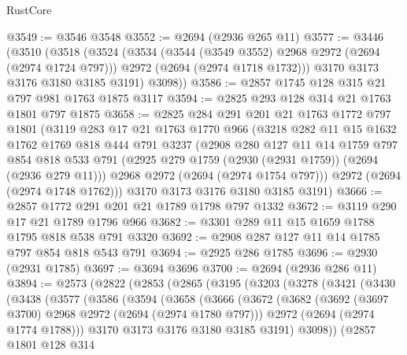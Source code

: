 \begin{lexlean}{RustCore}
\begin{coremodule}
@3549 := @3546 @3548
@3552 := @2694 (@2936 @265 @11)
@3577 := @3446
    (@3510
      (@3518
        (@3524
          (@3534
            (@3544 (@3549 @3552) @2968 @2972 (@2694 (@2974 @1724 @797)))
            @2972
            (@2694 (@2974 @1718 @1732)))
          @3170
          @3173
          @3176
          @3180
          @3185
          @3191)
        @3098))
@3586 := @2857 @1745 @128 @315 @21 @797 @981 @1763 @1875 @3117
@3594 := @2825 @293 @128 @314 @21 @1763 @1801 @797 @1875
@3658 := @2825
    @284
    @291
    @201
    @21
    @1763
    @1772
    @797
    @1801
    (@3119
      @283
      @17
      @21
      @1763
      @1770
      @966
      (@3218
        @282
        @11
        @15
        @1632
        @1762
        @1769
        @818
        @444
        @791
        @3237
        (@2908
          @280
          @127
          @11
          @14
          @1759
          @797
          @854
          @818
          @533
          @791
          (@2925 @279 @1759 (@2930 (@2931 @1759)) (@2694 (@2936 @279 @11)))
          @2968
          @2972
          (@2694 (@2974 @1754 @797)))
        @2972
        (@2694 (@2974 @1748 @1762)))
      @3170
      @3173
      @3176
      @3180
      @3185
      @3191)
@3666 := @2857 @1772 @291 @201 @21 @1789 @1798 @797 @1332
@3672 := @3119 @290 @17 @21 @1789 @1796 @966
@3682 := @3301 @289 @11 @15 @1659 @1788 @1795 @818 @538 @791 @3320
@3692 := @2908 @287 @127 @11 @14 @1785 @797 @854 @818 @543 @791
@3694 := @2925 @286 @1785
@3696 := @2930 (@2931 @1785)
@3697 := @3694 @3696
@3700 := @2694 (@2936 @286 @11)
@3894 := @2573
    (@2822
      (@2853
        (@2865
          (@3195
            (@3203
              (@3278
                (@3421
                  (@3430
                    (@3438
                      (@3577
                        (@3586
                          (@3594
                            (@3658
                              (@3666
                                (@3672
                                  (@3682
                                    (@3692 (@3697 @3700) @2968 @2972 (@2694 (@2974 @1780 @797)))
                                    @2972
                                    (@2694 (@2974 @1774 @1788)))
                                  @3170
                                  @3173
                                  @3176
                                  @3180
                                  @3185
                                  @3191)
                                @3098))
                            (@2857
                              @1801
                              @128
                              @314

\end{coremodule}
\end{lexlean}
